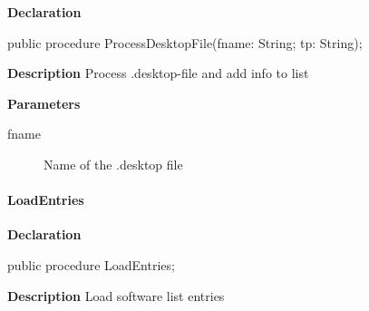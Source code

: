 \documentclass{report}
\newif\ifpdf
\begin{document}
\label{manager.TMnFrm-ProcessDesktopFile}
\begin{list}{}{
\setlength{\itemindent}{0cm}
\setlength{\listparindent}{0cm}
\setlength{\leftmargin}{\evensidemargin}
\addtolength{\leftmargin}{\tmplength}
\settowidth{\labelsep}{X}
\addtolength{\leftmargin}{\labelsep}
\setlength{\labelwidth}{\tmplength}
}
\item[\textbf{Declaration}\hfill]
\ifpdf
\begin{flushleft}
\fi
\begin{ttfamily}
public procedure ProcessDesktopFile(fname: String; tp: String);\end{ttfamily}

\ifpdf
\end{flushleft}
\fi

\par
\item[\textbf{Description}]
Process .desktop{-}file and add info to list \par
\item[\textbf{Parameters}]
\begin{description}
\item[fname] Name of the .desktop file
\end{description}


\end{list}
\paragraph*{LoadEntries}\hspace*{\fill}

\label{manager.TMnFrm-LoadEntries}
\begin{list}{}{
\setlength{\itemindent}{0cm}
\setlength{\listparindent}{0cm}
\setlength{\leftmargin}{\evensidemargin}
\addtolength{\leftmargin}{\tmplength}
\settowidth{\labelsep}{X}
\addtolength{\leftmargin}{\labelsep}
\setlength{\labelwidth}{\tmplength}
}
\item[\textbf{Declaration}\hfill]
\ifpdf
\begin{flushleft}
\fi
\begin{ttfamily}
public procedure LoadEntries;\end{ttfamily}

\ifpdf
\end{flushleft}
\fi

\par
\item[\textbf{Description}]
Load software list entries

\end{list}
\end{document}
